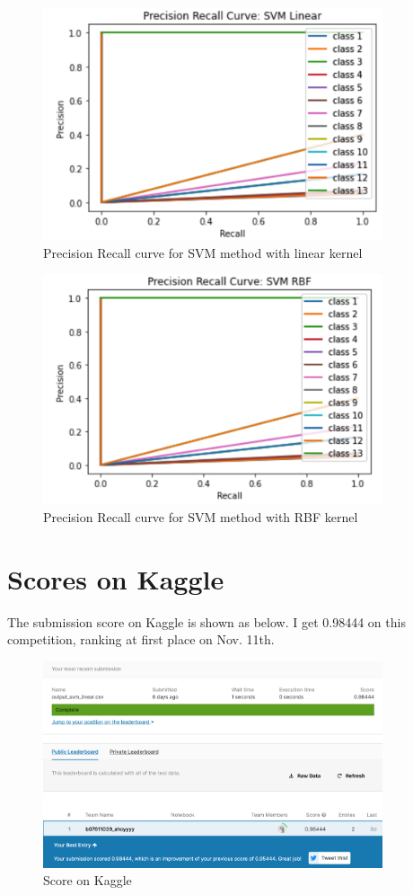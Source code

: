 \documentclass[a4paper]{article}
\theoremstyle{plain}
\begin{document}
\begin{figure}[htp]
    \centering
    \includegraphics[width=10cm]{fig/svmL_fig.png}
    \caption{Precision Recall curve for SVM method with linear kernel}
    \label{fig:galaxy}
\end{figure}

\begin{figure}[htp]
    \centering
    \includegraphics[width=10cm]{fig/svmR_fig.png}
    \caption{Precision Recall curve for SVM method with RBF kernel}
    \label{fig:galaxy}
\end{figure}
\newpage
\section{Scores on Kaggle}
The submission score on Kaggle is shown as below. I get 0.98444 on this competition, ranking at first place on Nov. 11th.
\begin{figure}[htp]
    \centering
    \includegraphics[width=10cm]{fig/scores}
    \caption{Score on Kaggle}
    \label{fig:galaxy}
\end{figure}
\end{document}
